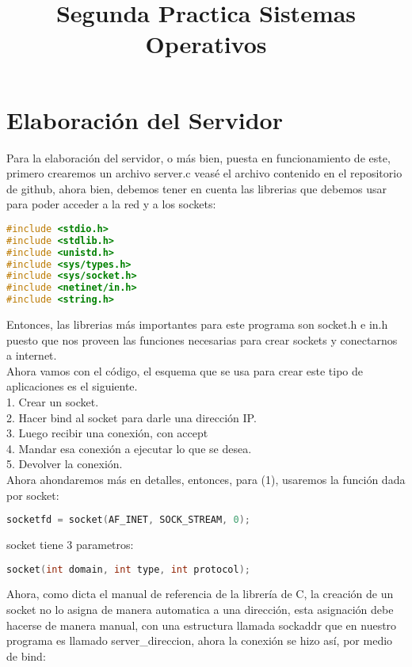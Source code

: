 \documentclass{article}
\title{Segunda Practica Sistemas Operativos}
\begin{document}
\maketitle



\section{Elaboración del Servidor}
Para la elaboración del servidor, o más bien, puesta en funcionamiento de este, primero crearemos un archivo server.c
veasé el archivo contenido en el repositorio de github, ahora bien, debemos tener en cuenta las librerias que debemos usar para poder acceder a la red y a los sockets:
\begin{lstlisting}[language=C]
#include <stdio.h>
#include <stdlib.h>
#include <unistd.h>
#include <sys/types.h>
#include <sys/socket.h>
#include <netinet/in.h>
#include <string.h>
\end{lstlisting}
Entonces, las librerias más importantes para este programa son socket.h e in.h puesto que nos proveen las funciones necesarias para crear sockets y conectarnos a internet.\\
Ahora vamos con el código, el esquema que se usa para crear este tipo de aplicaciones es el siguiente.\\ 
1. Crear un socket.\\
2. Hacer bind al socket para darle una dirección IP.\\
3. Luego recibir una conexión, con accept\\ 
4. Mandar esa conexión a ejecutar lo que se desea.\\ 
5. Devolver la conexión.\\
Ahora ahondaremos más en detalles, entonces, para (1), usaremos la función dada por socket: 
\begin{lstlisting}[language=C]
socketfd = socket(AF_INET, SOCK_STREAM, 0);
\end{lstlisting}

socket\cite{man7socket} tiene 3 parametros:

\begin{lstlisting}[language=C]
socket(int domain, int type, int protocol);
\end{lstlisting}

Ahora, como dicta el manual de referencia de la librería de C\cite{manual}, la creación de un socket no lo asigna de manera automatica a una dirección, esta asignación debe hacerse de manera manual, con una estructura llamada sockaddr que en nuestro programa es llamado server\_direccion, ahora la conexión se hizo así, por medio de bind\cite{man7bind}:
\end{document}
